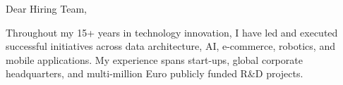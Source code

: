 \clearpage
{}




\vspace{4ex}

Dear Hiring Team,

\vspace{2ex}


Throughout my 15+ years in technology innovation, I have led and executed successful initiatives across data architecture, AI, e-commerce, robotics, and mobile applications. My experience spans start-ups, global corporate headquarters, and multi-million Euro publicly funded R\&D projects. %

\vspace{1ex}


